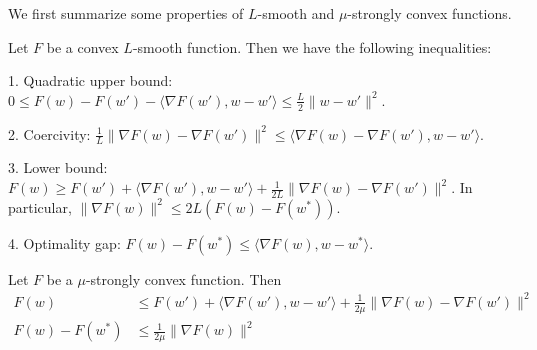 We first summarize some properties of $L$-smooth and $\mu$-strongly
convex functions. 
\begin{lemma}
	Let $F$ be a convex $L$-smooth function. Then we have the following
	inequalities:
	
	1. Quadratic upper bound: $0\leq F(w)-F(w')-\langle\nabla F(w'),w-w'\rangle\leq\frac{L}{2}\|w-w'\|^{2}$. 
	
	2. Coercivity: $\frac{1}{L}\|\nabla F(w)-\nabla F(w')\|^{2}\leq\langle\nabla F(w)-\nabla F(w'),w-w'\rangle$.
	
	3. Lower bound: $F(w)\geq F(w')+\langle\nabla F(w'),w-w'\rangle+\frac{1}{2L}\|\nabla F(w)-\nabla F(w')\|^{2}$.
	In particular, $\|\nabla F(w)\|^{2}\leq2L(F(w)-F(w^{\ast}))$.
	
	4. Optimality gap: $F(w)-F(w^{\ast})\leq$$\langle\nabla F(w),w-w^{\ast}\rangle$.
\end{lemma}
%
\begin{lemma}
	Let $F$ be a $\mu$-strongly convex function. Then 
	\begin{align*}
	F(w) & \leq F(w')+\langle\nabla F(w'),w-w'\rangle+\frac{1}{2\mu}\|\nabla F(w)-\nabla F(w')\|^{2}\\
	F(w)-F(w^{\ast}) & \leq\frac{1}{2\mu}\|\nabla F(w)\|^{2}
	\end{align*}
\end{lemma}
